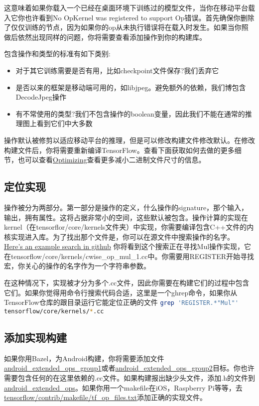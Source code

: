 这意味着如果你载入一个已经在桌面环境下训练过的模型文件，当你在移动平台载入它你也许看到No OpKernel was  registered to support Op错误。首先确保你删除了仅仅训练的节点，因为如果你的op从未执行错误将在载入时发生。如果当你照做后依然出现同样的问题，你将需要查看添加操作到你的构建库。

包含操作和类型的标准有如下类别:
\begin{itemize}
	\item 对于其它训练需要是否有用，比如checkpoint文件保存?我们丢弃它
	\item 是否以来的框架是移动端可用的，如libjpeg。避免额外的依赖，我们博包含DecodeJpeg操作
	\item 有不常使用的类型?我们不包含操作的boolean变量，因此我们不能在通常的推理图上看到它们中大多数
\end{itemize}
操作默认被修剪以适应移动平台的推理，但是可以修改构建文件修改默认。在修改构建文件后，你将需要重新编译TensorFlow。查看下面获取如何去做的更多细节，也可以查看\href{https://www.tensorflow.org/mobile/optimizing?hl=zh-cn#binary_size}{Optimizing}查看更多减小二进制文件尺寸的信息。
\subsection{定位实现}
操作被分为两部分。第一部分是操作的定义，什么操作的signature，那个输入，输出，拥有属性。这将占据非常小的空间，这些默认被包含。操作计算的实现在kernel（在tensorflor/core/kernels文件夹）中实现，你需要编译包含C++文件的内核实现进入库。为了找出那个文件是，你可以在源文件中搜索操作的名字。
\href{https://github.com/search?utf8=%E2%9C%93&q=repo%3Atensorflow%2Ftensorflow+extension%3Acc+path%3Atensorflow%2Fcore%2Fkernels+REGISTER+Mul&type=Code&ref=searchresults}{Here’s an example search in github}
你将看到这个搜索正在寻找Mul操作实现，它在tensorflow/core/kernels/cwise\_op\_mul\_1.cc中。你需要用REGISTER开始寻找宏，你关心的操作的名字作为一个字符串参数。

在这种情况下，实现被才分为多个.cc文件，因此你需要在构建它们的过程中包含它们。如果你觉得用命令行搜索代码合适，这里是一个ghrep命令，如果你从TensorFlow仓库的跟目录运行它能定位正确的文件
\lstinline[language=Bash]{grep 'REGISTER.*"Mul"' tensorflow/core/kernels/*.cc}
\subsection{添加实现构建}
如果你用Bazel，为Android构建，你将需要添加文件\href{https://www.github.com/tensorflow/tensorflow/blob/r1.4/tensorflow/core/kernels/BUILD#L3565}{android\_extended\_ops\_group1}或者\href{https://www.github.com/tensorflow/tensorflow/blob/r1.4/tensorflow/core/kernels/BUILD#L3632}{android\_extended\_ops\_group2}目标。你也许需要包含任何的在这里依赖的.cc文件。如果构建报出缺少头文件，添加.h的文件到\href{https://www.github.com/tensorflow/tensorflow/blob/r1.4/tensorflow/core/kernels/BUILD#L3525}{android\_extended\_ops}。如果你用一个makefile在iOS，Raspberry Pi等等，去\href{https://www.github.com/tensorflow/tensorflow/blob/r1.4/tensorflow/contrib/makefile/tf_op_files.txt}{tensorflow/contrib/makefile/tf\_op\_files.txt}添加正确的实现文件。
